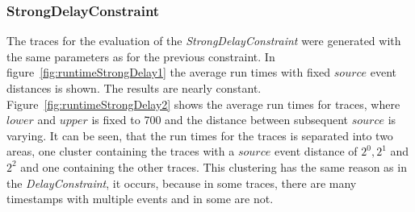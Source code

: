 \subsubsection{StrongDelayConstraint}
	The traces for the evaluation of the \textit{StrongDelayConstraint} were generated with the same parameters as for the previous constraint. In figure~\ref{fig:runtimeStrongDelay1} the average run times with fixed $source$ event distances is shown. The results are nearly constant. Figure~\ref{fig:runtimeStrongDelay2} shows the average run times for traces, where $lower$ and $upper$ is fixed to 700 and the distance between subsequent $source$ is varying. It can be seen, that the run times for the traces is separated into two areas, one cluster containing the traces with a $source$ event distance of $2^0, 2^1$ and $2^2$ and one containing the other traces. This clustering has the same reason as in the \textit{DelayConstraint}, it occurs, because in some traces, there are many timestamps with multiple events and in some are not.
	
